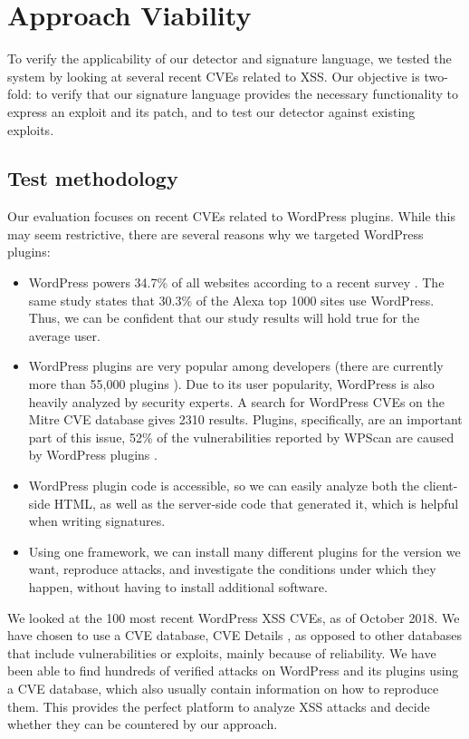 \section{Approach Viability} \label{viability}

To verify the applicability of our detector and signature language, we tested the system by looking at several recent CVEs related to \ac{XSS}. Our objective is two-fold: to verify that our signature language provides the necessary functionality to express an exploit and its patch, and to test our detector against existing exploits.

\subsection{Test methodology} \label{methodology}

Our evaluation focuses on recent CVEs related to WordPress
plugins. While this may seem restrictive, there are several reasons
why we targeted WordPress plugins:
\begin{itemize}
	\item WordPress powers 34.7\% of all websites according to a recent survey  \cite{w3stats}. The same study states that 30.3\% of the Alexa top 1000 sites use WordPress. Thus, we can be confident that our study results will hold true for the average user.
	\item WordPress plugins are very popular among developers (there are currently more than 55,000 plugins \cite{wpplugins}). Due to its user popularity, WordPress is also heavily analyzed by security experts. A search for WordPress CVEs on the Mitre CVE database \cite{cvemitre} gives 2310 results. Plugins, specifically, are an important part of this issue, 52\% of the vulnerabilities reported by WPScan are caused by WordPress plugins \cite{wpscan}.
	\item WordPress plugin code is accessible, so we can easily analyze both the client-side HTML, as well as the server-side code that generated it, which is helpful when writing signatures.
	\item Using one framework, we can install many different plugins for the version we want, reproduce attacks, and investigate the conditions under which they happen, without having to install additional software.
\end{itemize}

We looked at the 100 most recent WordPress \ac{XSS} CVEs, as of October 2018. We have chosen to use a CVE database, CVE Details \cite{cvedetails}, as opposed to other databases that include vulnerabilities or exploits, mainly because of reliability. We have been able to find hundreds of verified attacks on WordPress and its plugins using a CVE database, which also usually contain information on how to reproduce them. This provides the perfect platform to analyze \ac{XSS} attacks and decide whether they can be countered by our approach. 

